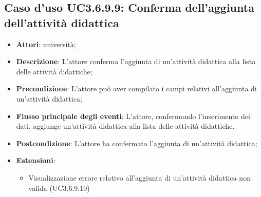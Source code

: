 \subsection{Caso d'uso \texorpdfstring{UC3.6.9.9}{UC3.6.9.9}: Conferma dell’aggiunta dell’attività didattica}
\begin{itemize}
\item \textbf{Attori}: università;
\item \textbf{Descrizione}: L'attore conferma l'aggiunta di un’attività didattica alla lista delle attività didattiche;

\item \textbf{Precondizione}: L'attore può aver compilato i campi relativi all'aggiunta di un’attività didattica;

\item \textbf{Flusso principale degli eventi}: L'attore, confermando l'inserimento dei dati, aggiunge un’attività didattica alla lista delle attività didattiche.

\item \textbf{Postcondizione}: L'attore ha confermato l'aggiunta di un’attività didattica;

\item \textbf{Estensioni}:
\begin{itemize}
\item Visualizzazione errore relativo all’aggiunta di un’attività didattica non valida (UC3.6.9.10)
\end{itemize}
\end{itemize}
